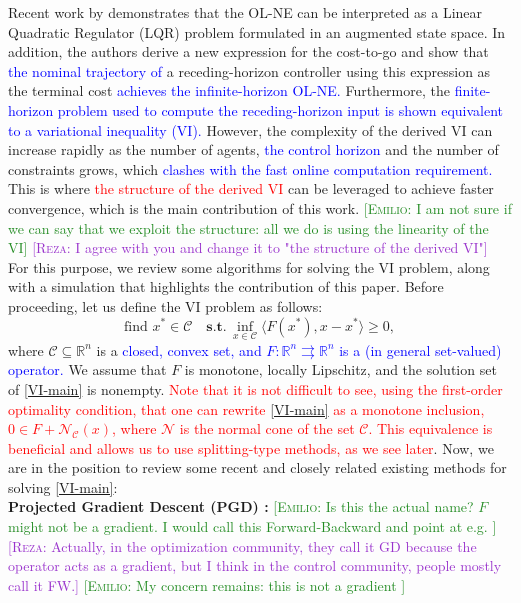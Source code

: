 \documentclass[letterpaper, 10 pt, conference]{ieeeconf}  %
\newcommand{\edit}[1]{\textcolor{blue}{#1}}
\newcommand{\emiliosay}[1]{\textcolor{ForestGreen}{[\textsc{Emilio:} #1]}}
\newcommand{\rezasay}[1]{\textcolor{DarkOrchid}{[\textsc{Reza:} #1]}}
\newcommand{\R}{\mathbb{R}}
\newcommand{\red}[1]{\textcolor{red}{#1}}
\begin{document}
Recent work by \cite{benenati2024linear} demonstrates that the OL-NE can be interpreted as a Linear Quadratic Regulator (LQR) problem formulated in an augmented state space. In addition, the authors derive a new expression for the cost-to-go and show that \edit{the nominal trajectory of} a receding-horizon controller using this expression as the terminal cost \edit{achieves the infinite-horizon OL-NE.} Furthermore, the \edit{finite-horizon problem used to compute the receding-horizon input is shown equivalent to a variational inequality (VI).} However, the complexity of the derived VI can increase rapidly as the number of agents, \edit{the control horizon} and the number of constraints grows, which \edit{clashes with the fast online computation requirement.} This is where \red{the structure of the derived VI} can be leveraged to achieve faster convergence, which is the main contribution of this work. \emiliosay{I am not sure if we can say that we exploit the structure: all we do is using the linearity of the VI} \rezasay{I agree with you and change it to "the structure of the derived VI"} For this purpose, we review some algorithms for solving the VI problem, along with a simulation that highlights the contribution of this paper. Before proceeding, let us define the VI problem as follows:
\begin{equation}\label{VI-main}
\text{find} \,\, x^* \in \mathcal{C} \quad \textbf{s.t.} \, \inf\limits_{x\in \mathcal{C}}\langle F(x^*), x - x^* \rangle \geq 0,
\end{equation}
where $\mathcal{C}\subseteq\R^n$ is a \edit{closed, convex set, and $F:\R^n\rightrightarrows \R^n$ is a (in general set-valued) operator.} We assume that $F$ is monotone, locally Lipschitz, and the solution set of \eqref{VI-main} is nonempty. \red{Note that it is not difficult to see, using the first-order optimality condition, that one can rewrite \eqref{VI-main} as a monotone inclusion, $0 \in F + \mathcal{N}_{\mathcal{C}}(x)$, where $\mathcal{N}$ is the normal cone of the set \(\mathcal{C}\). This equivalence is beneficial and allows us to use splitting-type methods, as we see later}. Now, we are in the position to review some recent and closely related existing methods for solving \eqref{VI-main}:\\
\textbf{Projected Gradient Descent (PGD) \cite{nemirovskij1983problem}:}  
\emiliosay{Is this the actual name? $F$ might not be a gradient. I would call this Forward-Backward and point at e.g. \cite[\S 12.5.1]{facchinei2003finite}}\rezasay{Actually, in the optimization community, they call it GD because the operator acts as a gradient, but I think in the control community, people mostly call it FW.} \emiliosay{My concern remains: this is not a gradient }
\end{document}
